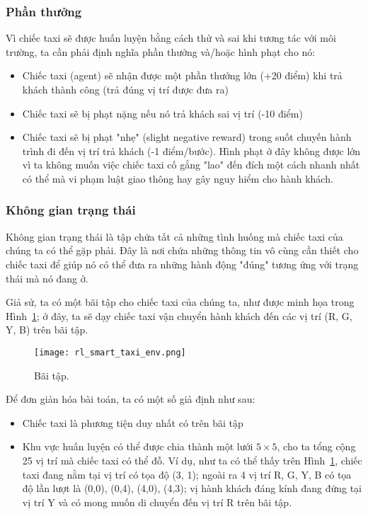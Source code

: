 \subsubsection{Phần thưởng}
Vì chiếc taxi sẽ được huấn luyện bằng cách
thử và sai khi tương tác với môi trường,
ta cần phải định nghĩa phần thưởng và/hoặc hình phạt cho nó:
\begin{itemize}
    \item Chiếc taxi (agent) sẽ nhận được một phần thưởng lớn (+20 điểm)
    khi trả khách thành công (trả đúng vị trí được đưa ra)
    \item Chiếc taxi sẽ bị phạt nặng nếu nó trả khách sai vị trí (-10 điểm)
    \item Chiếc taxi sẽ bị phạt "nhẹ" (slight negative reward)
    trong suốt chuyến hành trình đi đến vị trí trả khách (-1 điểm/bước).
    Hình phạt ở đây không được lớn vì ta không muốn
    việc chiếc taxi cố gắng "lao" đến đích một cách nhanh nhất có thể
    mà vi phạm luật giao thông hay gây nguy hiểm cho hành khách.
\end{itemize}

\subsubsection{Không gian trạng thái}
Không gian trạng thái là tập chứa tất cả những tình huống
mà chiếc taxi của chúng ta có thể gặp phải.
Đây là nơi chứa những thông tin vô cùng cần thiết
cho chiếc taxi để giúp nó có thể đưa ra những hành động "đúng"
tương ứng với trạng thái mà nó đang ở.

Giả sử, ta có một bãi tập cho chiếc taxi của chúng ta,
như được minh họa trong Hình~\ref{fig:training_area};
ở đây, ta sẽ dạy chiếc taxi vận chuyển hành khách
đến các vị trí (R, G, Y, B) trên bãi tập.
\begin{figure}[H]
    \centering
    \texttt{[image: rl\_smart\_taxi\_env.png]}
    \caption{Bãi tập.}
    \label{fig:training_area}
\end{figure}

Để đơn giản hóa bài toán, ta có một số giả định như sau:
\begin{itemize}
    \item Chiếc taxi là phương tiện duy nhất có trên bãi tập
    \item Khu vực huấn luyện có thể được chia thành một lưới $5 \times 5$,
    cho ta tổng cộng 25 vị trí mà chiếc taxi có thể đỗ.
    Ví dụ, như ta có thể thấy trên Hình~\ref{fig:training_area},
    chiếc taxi đang nằm tại vị trí có tọa độ (3, 1);
    ngoài ra 4 vị trí R, G, Y, B có tọa độ lần lượt là
    (0,0), (0,4), (4,0), (4,3);
    vị hành khách đáng kính đang đứng tại vị trí Y
    và có mong muốn di chuyển đến vị trí R trên bãi tập.
\end{itemize}

